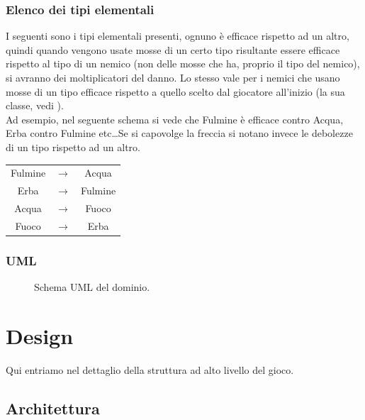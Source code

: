 \documentclass[a4paper,12pt]{report}
\begin{document}
\subsection{Elenco dei tipi elementali} \label{ss:tipi}
I seguenti sono i tipi elementali presenti, ognuno è efficace rispetto ad un altro, quindi quando vengono usate mosse di un certo tipo risultante essere efficace rispetto al tipo di un nemico (non delle mosse che ha, proprio il tipo del nemico), si avranno dei moltiplicatori del danno. Lo stesso vale per i nemici che usano mosse di un tipo efficace rispetto a quello scelto dal giocatore all'inizio (la sua classe, vedi \textit{}).
\\
Ad esempio, nel seguente schema si vede che Fulmine è efficace contro Acqua, Erba contro Fulmine etc\dots Se si capovolge la freccia si notano invece le debolezze di un tipo rispetto ad un altro.

\begin{center}
\begin{tabular}{ c c c }
    Fulmine & $\longrightarrow$ & Acqua \\
    Erba & $\longrightarrow$ & Fulmine \\
    Acqua & $\longrightarrow$ & Fuoco \\
    Fuoco & $\longrightarrow$ & Erba \\
\end{tabular}
\end{center}

\subsection{UML}
\begin{figure}[H]
	\centering
	
	\caption{Schema UML del dominio.} \label{fig:Schema UML del dominio.}
\end{figure}

\chapter{Design}

Qui entriamo nel dettaglio della struttura ad alto livello del gioco.

\section{Architettura}
\end{document}
